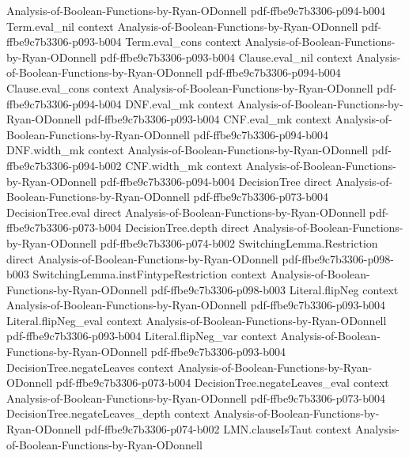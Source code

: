 \begin{lemma}
  {Analysis-of-Boolean-Functions-by-Ryan-ODonnell}
  {pdf-ffbe9c7b3306-p094-b004}
\proofstep
  {Term.eval_nil}
  {context}
  {Analysis-of-Boolean-Functions-by-Ryan-ODonnell}
  {pdf-ffbe9c7b3306-p093-b004}
\proofstep
  {Term.eval_cons}
  {context}
  {Analysis-of-Boolean-Functions-by-Ryan-ODonnell}
  {pdf-ffbe9c7b3306-p093-b004}
\proofstep
  {Clause.eval_nil}
  {context}
  {Analysis-of-Boolean-Functions-by-Ryan-ODonnell}
  {pdf-ffbe9c7b3306-p094-b004}
\proofstep
  {Clause.eval_cons}
  {context}
  {Analysis-of-Boolean-Functions-by-Ryan-ODonnell}
  {pdf-ffbe9c7b3306-p094-b004}
\proofstep
  {DNF.eval_mk}
  {context}
  {Analysis-of-Boolean-Functions-by-Ryan-ODonnell}
  {pdf-ffbe9c7b3306-p093-b004}
\proofstep
  {CNF.eval_mk}
  {context}
  {Analysis-of-Boolean-Functions-by-Ryan-ODonnell}
  {pdf-ffbe9c7b3306-p094-b004}
\proofstep
  {DNF.width_mk}
  {context}
  {Analysis-of-Boolean-Functions-by-Ryan-ODonnell}
  {pdf-ffbe9c7b3306-p094-b002}
\proofstep
  {CNF.width_mk}
  {context}
  {Analysis-of-Boolean-Functions-by-Ryan-ODonnell}
  {pdf-ffbe9c7b3306-p094-b004}
\proofstep
  {DecisionTree}
  {direct}
  {Analysis-of-Boolean-Functions-by-Ryan-ODonnell}
  {pdf-ffbe9c7b3306-p073-b004}
\proofstep
  {DecisionTree.eval}
  {direct}
  {Analysis-of-Boolean-Functions-by-Ryan-ODonnell}
  {pdf-ffbe9c7b3306-p073-b004}
\proofstep
  {DecisionTree.depth}
  {direct}
  {Analysis-of-Boolean-Functions-by-Ryan-ODonnell}
  {pdf-ffbe9c7b3306-p074-b002}
\proofstep
  {SwitchingLemma.Restriction}
  {direct}
  {Analysis-of-Boolean-Functions-by-Ryan-ODonnell}
  {pdf-ffbe9c7b3306-p098-b003}
\proofstep
  {SwitchingLemma.instFintypeRestriction}
  {context}
  {Analysis-of-Boolean-Functions-by-Ryan-ODonnell}
  {pdf-ffbe9c7b3306-p098-b003}
\proofstep
  {Literal.flipNeg}
  {context}
  {Analysis-of-Boolean-Functions-by-Ryan-ODonnell}
  {pdf-ffbe9c7b3306-p093-b004}
\proofstep
  {Literal.flipNeg_eval}
  {context}
  {Analysis-of-Boolean-Functions-by-Ryan-ODonnell}
  {pdf-ffbe9c7b3306-p093-b004}
\proofstep
  {Literal.flipNeg_var}
  {context}
  {Analysis-of-Boolean-Functions-by-Ryan-ODonnell}
  {pdf-ffbe9c7b3306-p093-b004}
\proofstep
  {DecisionTree.negateLeaves}
  {context}
  {Analysis-of-Boolean-Functions-by-Ryan-ODonnell}
  {pdf-ffbe9c7b3306-p073-b004}
\proofstep
  {DecisionTree.negateLeaves_eval}
  {context}
  {Analysis-of-Boolean-Functions-by-Ryan-ODonnell}
  {pdf-ffbe9c7b3306-p073-b004}
\proofstep
  {DecisionTree.negateLeaves_depth}
  {context}
  {Analysis-of-Boolean-Functions-by-Ryan-ODonnell}
  {pdf-ffbe9c7b3306-p074-b002}
\proofstep
  {LMN.clauseIsTaut}
  {context}
  {Analysis-of-Boolean-Functions-by-Ryan-ODonnell}

\end{lemma}
